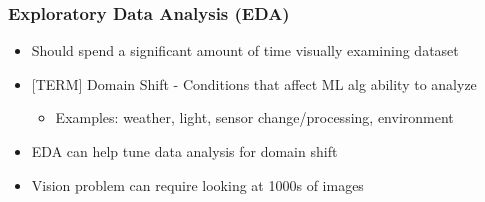 \documentclass[11pt,xcolor={dvipsnames},usepdftitle=false]{beamer}
\begin{document}
\begin{frame}
  \frametitle{Exploratory Data Analysis (EDA)}

  \begin{itemize}
    \small\item Should spend a significant amount of time visually examining dataset 
    \small\item $[$TERM$]$ Domain Shift - Conditions that affect ML alg ability to analyze
      \begin{itemize}
        \small\item Examples: weather, light, sensor change/processing, environment
      \end{itemize}
    \small\item EDA can help tune data analysis for domain shift
    \small\item Vision problem can require looking at 1000s of images 
  \end{itemize}

\end{frame}
\end{document}

